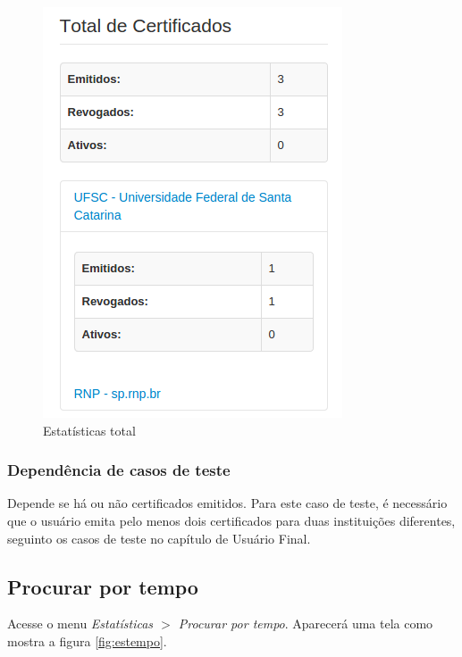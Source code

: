 \begin{figure}[ht]
     \centering
     \includegraphics[scale=0.6]{images/estatisticatotal.png}
     \caption{Estatísticas total}
     \label{fig:estotal}
\end{figure}

\subsubsection{Dependência de casos de teste}
Depende se há ou não certificados emitidos. Para este caso de teste, é necessário que o usuário emita pelo menos dois certificados para duas instituições diferentes, seguinto os casos de teste no capítulo de Usuário Final.

\subsection{Procurar por tempo}

Acesse o menu \textit{Estatísticas $>$ Procurar por tempo}. Aparecerá uma tela como mostra a figura \ref{fig:estempo}.

